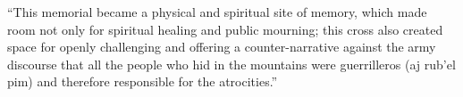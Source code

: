 \documentclass[12pt, notitlepage]{article}
\begin{document}
``This memorial became a physical and spiritual site of memory, which made room not only for spiritual healing and public mourning; this cross also created space for openly challenging and offering a counter-narrative against the army discourse that all the people who hid in the mountains were guerrilleros (aj rub’el pim) and therefore responsible for the atrocities.'' \citep[170--171]{Viaene:2011td}

%
%
%

\clearpage



% 
\end{document}
